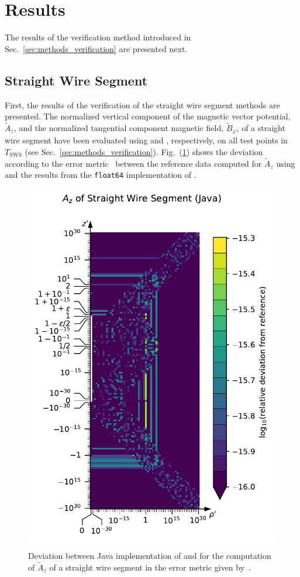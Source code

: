 \section{Results}
\label{sec:results}
The results of the verification method introduced in Sec.~\ref{sec:methods_verification}
are presented next.
\subsection{Straight Wire Segment}
First, the results of the verification of the straight wire segment methods are presented.
The normalized vertical component of the magnetic vector potential, $\tilde{A}_z$,
and the normalized tangential component magnetic field, $\tilde{B}_\varphi$, of a straight wire segment
have been evaluated using  and , respectively,
on all test points in $T_\mathrm{SWS}$ (see Sec.~\ref{sec:methods_verification}).
Fig.~(\ref{fig:StraightWireSegment_A_z_Java}) shows the deviation
according to the error metric~
between the reference data computed for $\tilde{A}_z$ using 
and the results from the \texttt{float64} implementation of .
\begin{figure}[htbp]
 \centering
 \includegraphics[height=0.8\textwidth]{img/StraightWireSegment_A_z_Java.pdf}
 \caption{Deviation between Java implementation of  and 
          for the computation of $\tilde{A}_z$ of a straight wire segment
          in the error metric given by~.}
 \label{fig:StraightWireSegment_A_z_Java}
\end{figure}
